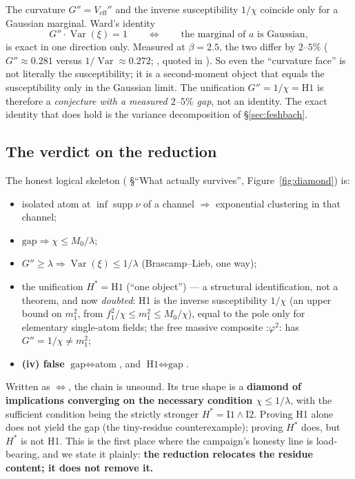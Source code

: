 The curvature $G''=V_{\mathrm{eff}}''$ and the inverse susceptibility $1/\chi$ coincide only for
a Gaussian marginal. Ward's identity
\begin{equation}
G''\cdot\operatorname{Var}(\xi)=1
\qquad\iff\qquad
\text{the marginal of } a \text{ is Gaussian},
\label{eq:ward}
\end{equation}
is exact in one direction only. Measured at $\beta=2.5$, the two differ by $2$--$5\%$
($G''\approx0.281$ versus $1/\operatorname{Var}\approx0.272$; ,
quoted in ). So even the ``curvature face'' is not literally
the susceptibility; it is a second-moment object that equals the susceptibility only in the
Gaussian limit. The unification $G''=1/\chi=\text{H1}$ is therefore a \emph{conjecture with a
measured $2$--$5\%$ gap}, not an identity. The exact identity that does hold is the variance
decomposition of \S\ref{sec:feshbach}.

\subsection{The verdict on the reduction}

The honest logical skeleton ( \S``What actually survives'',
Figure~\ref{fig:diamond}) is:

\begin{itemize}
\item \LT{} isolated atom at $\inf\operatorname{supp}\nu$ of a channel $\Rightarrow$ exponential
  clustering in that channel;
\item \LT{} $\text{gap}\Rightarrow\chi\le M_0/\lambda$;
\item \LT{} $G''\ge\lambda\Rightarrow\operatorname{Var}(\xi)\le1/\lambda$ (Brascamp--Lieb, one way);
\item \LC{} the unification $H^*=\text{H1}$ (``one object'') --- a structural identification,
  not a theorem, and now \emph{doubted}: H1 is the inverse susceptibility $1/\chi$ (an upper bound
  on $m_1^2$, from $f_1^2/\chi\le m_1^2\le M_0/\chi$), equal to the pole only for elementary
  single-atom fields; the free massive composite $\mathord{:}\varphi^2\mathord{:}$ has
  $G''=1/\chi\ne m_1^2$;
\item \textbf{(iv) false} $\text{gap}\iff\text{atom}$, and $\text{H1}\iff\text{gap}$.
\end{itemize}

Written as $\iff$, the chain is unsound. Its true shape is a \textbf{diamond of implications
converging on the necessary condition $\chi\le1/\lambda$}, with the sufficient condition being
the strictly stronger $H^*=\text{I1}\wedge\text{I2}$. Proving H1 alone does not yield the gap
(the tiny-residue counterexample); proving $H^*$ does, but $H^*$ is not H1. This is the first
place where the campaign's honesty line is load-bearing, and we state it plainly: \textbf{the
reduction relocates the residue content; it does not remove it.}


